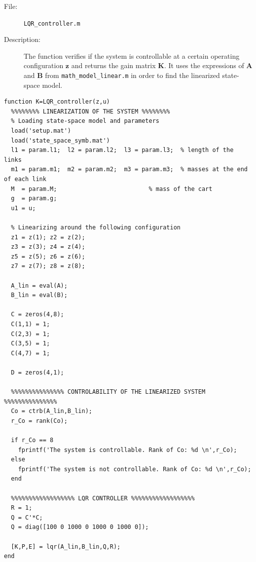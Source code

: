 \documentclass[a4paper,12pt]{article}
\begin{document}
\begin{description}
	\item[File:] \texttt{LQR\_controller.m}
	\item[Description:] The function verifies if the system is controllable at a certain operating configuration $\mathbf{z}$ and returns the gain matrix $\mathbf{K}$. It uses the expressions of $\mathbf{A}$ and $\mathbf{B}$ from \texttt{math\_model\_linear.m} in order to find the linearized state-space model.
\end{description}
\begin{lstlisting}[label=code:LQR,caption=\texttt{LQR\_controller.m}]
function K=LQR_controller(z,u)
  %%%%%%%% LINEARIZATION OF THE SYSTEM %%%%%%%%
  % Loading state-space model and parameters
  load('setup.mat')
  load('state_space_symb.mat')
  l1 = param.l1;  l2 = param.l2;  l3 = param.l3;  % length of the links
  m1 = param.m1;  m2 = param.m2;  m3 = param.m3;  % masses at the end of each link
  M  = param.M;                          % mass of the cart
  g  = param.g;
  u1 = u;

  % Linearizing around the following configuration
  z1 = z(1); z2 = z(2);
  z3 = z(3); z4 = z(4);
  z5 = z(5); z6 = z(6);
  z7 = z(7); z8 = z(8);

  A_lin = eval(A);
  B_lin = eval(B);

  C = zeros(4,8);
  C(1,1) = 1;
  C(2,3) = 1;
  C(3,5) = 1;
  C(4,7) = 1;

  D = zeros(4,1);

  %%%%%%%%%%%%%%% CONTROLABILITY OF THE LINEARIZED SYSTEM %%%%%%%%%%%%%%%
  Co = ctrb(A_lin,B_lin);
  r_Co = rank(Co);

  if r_Co == 8
    fprintf('The system is controllable. Rank of Co: %d \n',r_Co);
  else
    fprintf('The system is not controllable. Rank of Co: %d \n',r_Co);
  end

  %%%%%%%%%%%%%%%%%% LQR CONTROLLER %%%%%%%%%%%%%%%%%%
  R = 1;
  Q = C'*C;
  Q = diag([100 0 1000 0 1000 0 1000 0]);

  [K,P,E] = lqr(A_lin,B_lin,Q,R);
end

\end{lstlisting}
\end{document}
